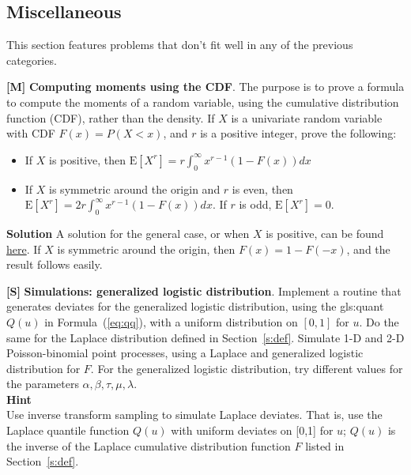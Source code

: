 \documentclass[10pt]{article}
\begin{document}
\subsection{Miscellaneous}

This section features problems that don't fit well in any of the previous categories.

\begin{Exercise} \label{exercise5} {\bf [M]}
{\bf Computing moments using the CDF}. The purpose is to prove a formula to compute the moments of a random variable, using the cumulative distribution function (CDF), rather than the density. If $X$ is a univariate random variable with CDF $F(x)=P(X<x)$, and $r$ is a positive integer, prove the following:
\begin{itemize}
\item If $X$ is positive, then $\mbox{E}[X^r]=r\int_0^\infty x^{r-1}(1-F(x))dx$
\item If $X$ is symmetric around the origin and $r$ is even, then $\mbox{E}[X^r]=2r\int_0^\infty x^{r-1} (1-F(x))dx$. If $r$ is odd, $\mbox{E}[X^r]=0$.
\end{itemize}
{\bf Solution} A solution for the general case, or when $X$ is positive, can be found \href{https://math.stackexchange.com/questions/1260157/moments-of-a-random-variable-in-terms-of-its-cumulative-distribution-function}{here}. If $X$ is symmetric around the origin, then $F(x)=1-F(-x)$, and the result follows easily.
\end{Exercise}

\begin{Exercise}\label{exercise10}
{\bf [S]} {\bf Simulations: generalized logistic distribution}. Implement a routine that generates deviates for the \textcolor{index}{generalized logistic distribution}, using the \gls{gls:quant} $Q(u)$ in Formula~(\ref{eq:qq}), with a uniform distribution on $[0,1]$ for $u$. Do the same for the
\textcolor{index}{Laplace distribution}
defined in Section~\ref{s:def}. Simulate 1-D and 2-D Poisson-binomial point processes, using a Laplace and generalized logistic distribution for $F$. For the generalized logistic distribution, try different values for the parameters $\alpha,\beta,\tau,\mu,\lambda$. \vspace{1ex}   \\
{\bf Hint} \vspace{1ex}   \\
Use \textcolor{index}{inverse transform sampling} to simulate Laplace deviates. That is, use the Laplace quantile function $Q(u)$ with uniform deviates on [0,1] for $u$; $Q(u)$ is the inverse of the Laplace cumulative distribution function $F$ listed in Section~\ref{s:def}.
\end{Exercise}
\end{document}
